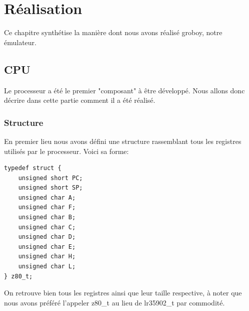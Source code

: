 \documentclass[french]{report}
\begin{document}
\chapter{Réalisation}
Ce chapitre synthétise la manière dont nous avons réalisé groboy, notre émulateur.
\section{CPU}
Le processeur a été le premier "composant" à être développé. Nous allons donc décrire dans cette partie comment il a été réalisé.
\subsection{Structure}
En premier lieu nous avons défini une structure rassemblant tous les registres utilisés par le processeur.
Voici sa forme:
\begin{lstlisting}
typedef struct {
	unsigned short PC;
	unsigned short SP;
	unsigned char A;
	unsigned char F;
	unsigned char B;
	unsigned char C;
	unsigned char D;
	unsigned char E;
	unsigned char H;
	unsigned char L;	
} z80_t;
\end{lstlisting}
On retrouve bien tous les registres ainsi que leur taille respective, à noter que nous avons préféré l'appeler z80\_t au lieu de lr35902\_t par commodité.
\end{document}
